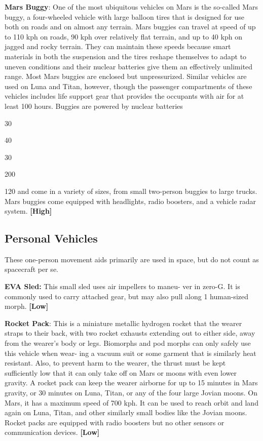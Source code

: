 \textbf{Mars Buggy}: One of the most ubiquitous vehicles 
on Mars is the so-called Mars buggy, a four-wheeled 
vehicle with large balloon tires that is designed for 
use both on roads and on almost any terrain. Mars 
buggies can travel at speed of up to 110 kph on roads, 
90 kph over relatively flat terrain, and up to 40 kph 
on jagged and rocky terrain. They can maintain these 
speeds because smart materials in both the suspension 
and the tires reshape themselves to adapt to uneven 
conditions and their nuclear batteries give them an 
effectively unlimited range. Most Mars buggies are 
enclosed but unpressurized. Similar vehicles are used 
on Luna and Titan, however, though the passenger 
compartments of these vehicles includes life support 
gear that provides the occupants with air for at least 
100 hours. Buggies are powered by nuclear batteries 

30

40

30

200

120
and come in a variety of sizes, from small two-person 
buggies to large trucks. Mars buggies come equipped 
with headlights, radio boosters, and a vehicle radar 
system. \textbf{[High]}

\subsection{Personal Vehicles}

These one-person movement aids primarily are used in 
space, but do not count as spacecraft per se.

\textbf{EVA Sled:} This small sled uses air impellers to maneu-
ver in zero-G. It is commonly used to carry attached gear, 
but may also pull along 1 human-sized morph. \textbf{[Low]}

\textbf{Rocket Pack}: This is a miniature metallic hydrogen 
rocket that the wearer straps to their back, with two 
rocket exhausts extending out to either side, away 
from the wearer's body or legs. Biomorphs and pod 
morphs can only safely use this vehicle when wear-
ing a vacuum suit or some garment that is similarly 
heat resistant. Also, to prevent harm to the wearer, the 
thrust must be kept sufficiently low that it can only 
take off on Mars or moons with even lower gravity. A 
rocket pack can keep the wearer airborne for up to 15 
minutes in Mars gravity, or 30 minutes on Luna, Titan, 
or any of the four large Jovian moons. On Mars, it 
has a maximum speed of 700 kph. It can be used to 
reach orbit and land again on Luna, Titan, and other 
similarly small bodies like the Jovian moons. Rocket 
packs are equipped with radio boosters but no other 
sensors or communication devices. \textbf{[Low]}

